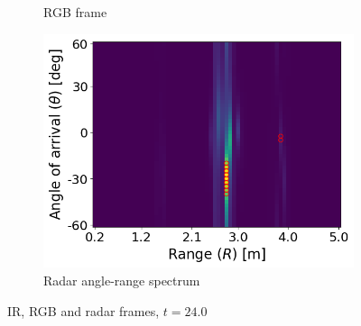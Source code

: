 \begin{figure}
\begin{subfigure}[t]{0.3\textwidth}
        \caption{RGB frame}
    \end{subfigure}
    \hfill
    \begin{subfigure}[t]{0.3\textwidth}
        \includegraphics[width=\textwidth]{fig/5/radar_t_24.0.png}
        \caption{Radar angle-range spectrum}
    \end{subfigure}
    \caption{IR, RGB and radar frames, $t = 24.0$}
    \label{fig:5-frames-2}
\end{figure}

